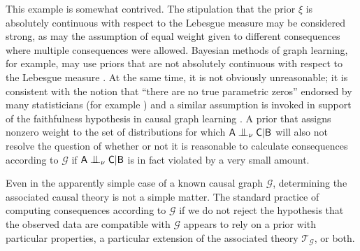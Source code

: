 This example is somewhat contrived. The stipulation that the prior $\xi$ is absolutely continuous with respect to the Lebesgue measure may be considered strong, as may the assumption of equal weight given to different consequences where multiple consequences were allowed. Bayesian methods of graph learning, for example, may use priors that are not absolutely continuous with respect to the Lebesgue measure \cite{chickering_optimal_2003}. At the same time, it is not obviously unreasonable; it is consistent with the notion that ``there are no true parametric zeros'' endorsed by many statisticians (for example  \cite{gelman_bayesian_2010,meehl_theory-testing_1967,berkson_difficulties_1938}) and a similar assumption is invoked in support of the faithfulness hypothesis in causal graph learning \cite{meek_strong_1995}. A prior that assigns nonzero weight to the set of distributions for which $\RV{A} \CI_\nu \RV{C} | \RV{B}$ will also not resolve the question of whether or not it is reasonable to calculate consequences according to $\mathcal{G}$ if $\RV{A} \CI_\nu \RV{C} | \RV{B}$ is in fact violated by a very small amount.

Even in the apparently simple case of a known causal graph $\mathcal{G}$, determining the associated causal theory is not a simple matter. The standard practice of computing consequences according to $\mathcal{G}$ if we do not reject the hypothesis that the observed data are compatible with $\mathcal{G}$ appears to rely on a prior with particular properties, a particular extension of the associated theory $\mathscr{T}_{\mathcal{G}}$, or both.